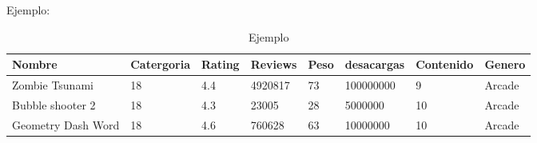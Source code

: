 \documentclass[10pt, a4paper]{article}
\begin{document}
\begin{enumerate}
\begin{enumerate}
\begin{enumerate}
\end{enumerate}
Ejemplo: \\
\begin{table}[H]
\centering
\begin{tabular}{|l|l|l|l|l|l|l|l|}
\hline
Nombre             & Catergoria & Rating & Reviews & Peso & desacargas & Contenido & Genero \\ \hline
Zombie Tsunami     & 18         & 4.4    & 4920817 & 73   & 100000000            & 9         & Arcade \\ \hline
Bubble shooter 2   & 18         & 4.3    & 23005   & 28   & 5000000              & 10        & Arcade \\ \hline
Geometry Dash Word & 18         & 4.6    & 760628  & 63   & 10000000             & 10        & Arcade \\ \hline
\end{tabular}
\caption{Ejemplo}
\label{Ejemplo}
\end{table}
\end{enumerate} 
\end{enumerate}
\end{document}
